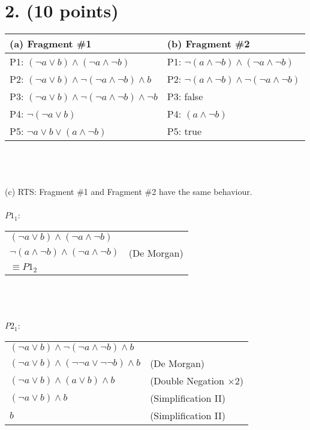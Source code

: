\documentclass{article}[12pt]
\begin{document}
\newpage
\section*{2. (10 points)} 

\begin{tabular}{|l|l|}
\hline
(a) Fragment \#1 & (b) Fragment \#2 \\
\hline
  P1: $(\lnot a \lor b) \land (\lnot a \land \lnot b)$ & P1: $\lnot (a \land \lnot b) \land (\lnot a \land \lnot b)$ \\
  P2: $(\lnot a \lor b) \land \lnot (\lnot a \land \lnot b) \land b$ & P2: $\lnot(a \land \lnot b) \land \lnot (\lnot a \land \lnot b)$ \\
  P3: $(\lnot a \lor b) \land \lnot (\lnot a \land \lnot b) \land \lnot b$ & P3: false \\
  P4: $\lnot (\lnot a \lor b)$ & P4: $(a \land \lnot b)$ \\
  P5: $\lnot a \lor b \lor (a \land \lnot b)$ & P5: true \\
\hline
\end{tabular}\\ \\ \\
(c) RTS: Fragment \#1 and Fragment \#2 have the same behaviour. \\ \\
$P1_{1}$: \\
\begin{tabular}{ll}
  $(\lnot a \lor b) \land (\lnot a \land \lnot b)$ \\
  $\lnot (a \land \lnot b) \land (\lnot a \land \lnot b)$ & (De Morgan) \\
  $\equiv P1_{2}$ \\
\end{tabular}\\ \\ \\
$P2_{1}$: \\
\begin{tabular}{ll}
  $(\lnot a \lor b) \land \lnot (\lnot a \land \lnot b) \land b$ \\
  $(\lnot a \lor b) \land (\lnot \lnot a \lor \lnot \lnot b) \land b$ & (De Morgan) \\
  $(\lnot a \lor b) \land (a \lor b) \land b$ & (Double Negation $\times$2) \\
  $(\lnot a \lor b) \land b$ & (Simplification II) \\
  $b$ & (Simplification II) \\
\end{tabular}\\ \\ \\
\end{document}

